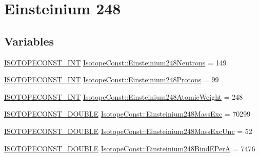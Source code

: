\hypertarget{group___isotope_const-_einsteinium-_es248}{}\section{Einsteinium 248}
\label{group___isotope_const-_einsteinium-_es248}
\subsection*{Variables}
\begin{DoxyCompactItemize}
\item 
\mbox{\hyperlink{group___isotope_const-_macros_ga5f18360b3e99483a35c32d789e62621c}{I\+S\+O\+T\+O\+P\+E\+C\+O\+N\+S\+T\+\_\+\+I\+NT}} \mbox{\hyperlink{group___isotope_const-_einsteinium-_es248_ga819cc5ebeba9fe30ba040a253e787a6e}{Isotope\+Const\+::\+Einsteinium248\+Neutrons}} = 149
\item 
\mbox{\hyperlink{group___isotope_const-_macros_ga5f18360b3e99483a35c32d789e62621c}{I\+S\+O\+T\+O\+P\+E\+C\+O\+N\+S\+T\+\_\+\+I\+NT}} \mbox{\hyperlink{group___isotope_const-_einsteinium-_es248_ga0644a99f36ce25b7501ffdf3bb2d9ac1}{Isotope\+Const\+::\+Einsteinium248\+Protons}} = 99
\item 
\mbox{\hyperlink{group___isotope_const-_macros_ga5f18360b3e99483a35c32d789e62621c}{I\+S\+O\+T\+O\+P\+E\+C\+O\+N\+S\+T\+\_\+\+I\+NT}} \mbox{\hyperlink{group___isotope_const-_einsteinium-_es248_gabc4dc175fb8f280ede25c40f7a047b51}{Isotope\+Const\+::\+Einsteinium248\+Atomic\+Weight}} = 248
\item 
\mbox{\hyperlink{group___isotope_const-_macros_ga8f45a7272ce02c0b4c65c44636ed719a}{I\+S\+O\+T\+O\+P\+E\+C\+O\+N\+S\+T\+\_\+\+D\+O\+U\+B\+LE}} \mbox{\hyperlink{group___isotope_const-_einsteinium-_es248_gae077618c057de0d9c5c8611e05f1beb6}{Isotope\+Const\+::\+Einsteinium248\+Mass\+Exc}} = 70299
\item 
\mbox{\hyperlink{group___isotope_const-_macros_ga8f45a7272ce02c0b4c65c44636ed719a}{I\+S\+O\+T\+O\+P\+E\+C\+O\+N\+S\+T\+\_\+\+D\+O\+U\+B\+LE}} \mbox{\hyperlink{group___isotope_const-_einsteinium-_es248_ga6f9b0f0e414f27f621b26f754d256646}{Isotope\+Const\+::\+Einsteinium248\+Mass\+Exc\+Unc}} = 52
\item 
\mbox{\hyperlink{group___isotope_const-_macros_ga8f45a7272ce02c0b4c65c44636ed719a}{I\+S\+O\+T\+O\+P\+E\+C\+O\+N\+S\+T\+\_\+\+D\+O\+U\+B\+LE}} \mbox{\hyperlink{group___isotope_const-_einsteinium-_es248_ga08b3ffe7aa5c708078729de9fb2e8b29}{Isotope\+Const\+::\+Einsteinium248\+Bind\+E\+PerA}} = 7476
\item 

\end{DoxyCompactItemize}
